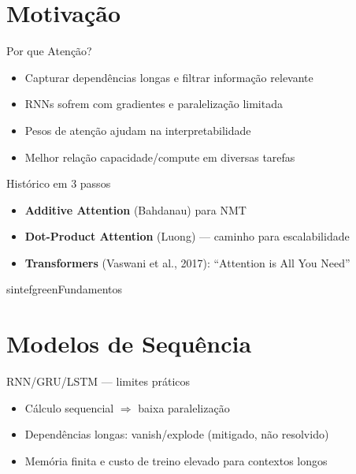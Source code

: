 \documentclass{beamer}
\begin{document}
\section{Motivação}
\begin{frame}{Por que Atenção?}
	\begin{itemize}[<+->]
		\item Capturar dependências longas e filtrar informação relevante
		\item RNNs sofrem com gradientes e paralelização limitada
		\item Pesos de atenção ajudam na interpretabilidade
		\item Melhor relação capacidade/compute em diversas tarefas
	\end{itemize}
\end{frame}

\begin{frame}{Histórico em 3 passos}
	\begin{itemize}[<+->]
		\item \textbf{Additive Attention} (Bahdanau) para NMT
		\item \textbf{Dot-Product Attention} (Luong) — caminho para escalabilidade
		\item \textbf{Transformers} (Vaswani et al., 2017): “Attention is All You Need”
	\end{itemize}
\end{frame}

\begin{chapter}{sintefgreen}{Fundamentos}\end{chapter}

\section{Modelos de Sequência}
\begin{frame}{RNN/GRU/LSTM — limites práticos}
	\begin{itemize}[<+->]
		\item Cálculo sequencial $\Rightarrow$ baixa paralelização
		\item Dependências longas: vanish/explode (mitigado, não resolvido)
		\item Memória finita e custo de treino elevado para contextos longos
	\end{itemize}
\end{frame}
\end{document}
